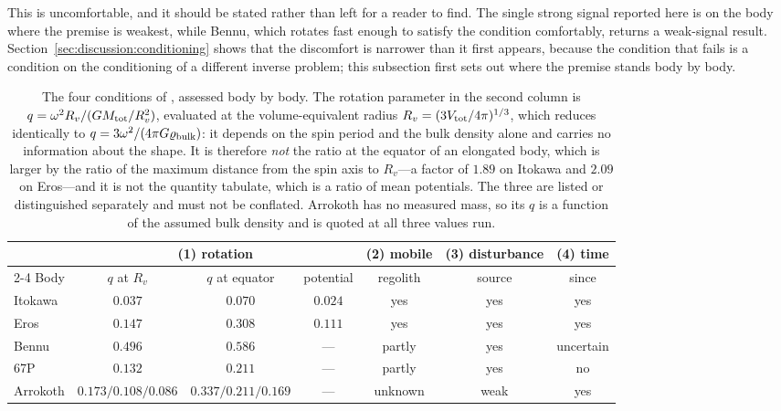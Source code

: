 This is uncomfortable, and it should be stated rather than left for a reader
to find. The single strong signal reported here is on the body where the
premise is weakest, while Bennu, which rotates fast enough to satisfy the
condition comfortably, returns a weak-signal result.
Section~\ref{sec:discussion:conditioning} shows that the discomfort is
narrower than it first appears, because the condition that fails is a
condition on the conditioning of a different inverse problem; this
subsection first sets out where the premise stands body by body.

\begin{table}[htbp]
\centering
\small
\caption{The four conditions of \citet{richardson2014}, assessed body by
body. The rotation parameter in the second column is
$q = \omega^{2}R_{v}/(GM_{\mathrm{tot}}/R_{v}^{2})$, evaluated at the
volume-equivalent radius $R_{v}=(3V_{\mathrm{tot}}/4\pi)^{1/3}$, which reduces
identically to $q = 3\omega^{2}/(4\pi G\varrho_{\mathrm{bulk}})$: it depends on the spin
period and the bulk density alone and carries no information about the
shape. It is therefore \emph{not} the ratio at the equator of an elongated
body, which is larger by the ratio of the maximum distance from the spin
axis to $R_{v}$---a factor of $1.89$ on Itokawa and $2.09$ on
Eros---and it is not the quantity \citet{richardson2014} tabulate, which is
a ratio of mean potentials. The three are listed or distinguished
separately and must not be conflated. Arrokoth has no measured mass, so its
$q$ is a function of the assumed bulk density and is quoted at all three
values run.}
\label{tab:conditions}
\setlength{\tabcolsep}{4.5pt}
\begin{tabular}{lcccccc}
\toprule
& \multicolumn{3}{c}{(1) rotation} & (2) mobile & (3) disturbance & (4) time \\
\cmidrule(lr){2-4}
Body & $q$ at $R_{v}$ & $q$ at equator & potential
 & regolith & source & since \\
\midrule
Itokawa  & $0.037$ & $0.070$ & $0.024$ & yes & yes & yes \\
Eros     & $0.147$ & $0.308$ & $0.111$ & yes & yes & yes \\
Bennu    & $0.496$ & $0.586$ & ---     & partly & yes & uncertain \\
67P      & $0.132$ & $0.211$ & ---     & partly & yes & no \\
Arrokoth & $0.173/0.108/0.086$ & $0.337/0.211/0.169$ & ---
         & unknown & weak & yes \\
\bottomrule
\end{tabular}


\end{table}

